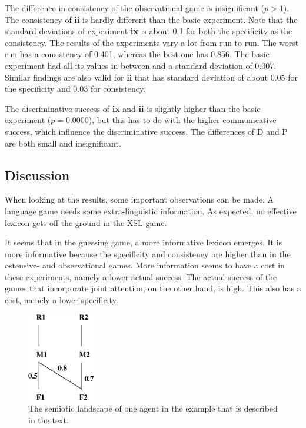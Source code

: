 The difference in consistency of the observational game is insignificant ($p>1$). The consistency of {\bf ii} is hardly different than the basic experiment. Note that the standard deviations of experiment {\bf ix} is about 0.1 for both the specificity as the consistency. The results of the experiments vary a lot from run to run. The worst run has a consistency of 0.401, whereas the best one has 0.856. The basic experiment had all its values in between and a standard deviation of 0.007. Similar findings are also valid for {\bf ii} that has standard deviation of about 0.05 for the specificity and 0.03 for consistency.

The discriminative success of {\bf ix} and {\bf ii} is slightly higher than the basic experiment ($p=0.0000$), but this has to do with the higher communicative success, which influence the discriminative success. The differences of D and P are both small and insignificant.

\subsection{Discussion}

When looking at the results, some important observations can be made. A language game needs some extra-linguistic information. As expected, no effective lexicon gets off the ground in the XSL game. 

It seems that in the guessing game, a more informative lexicon emerges. It is more informative because the specificity and consistency are higher than in the ostensive- and observational games. More information seems to have a cost in these experiments, namely a lower actual success. The actual success of the games that incorporate joint attention, on the other hand, is high. This also has a cost, namely a lower specificity.

\begin{figure}[t]
\centerline{\includegraphics[width=3cm]{feedback/example.eps}}
\caption{The semiotic landscape of one agent in the example that is described in the text.}
\label{f:par:example}
\end{figure}


